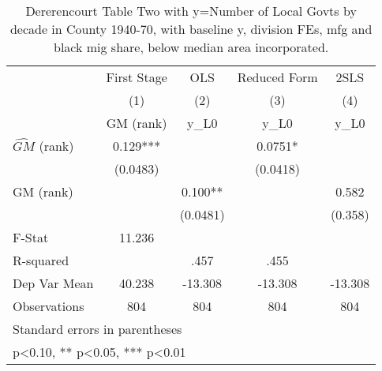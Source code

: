 \begin{table}[htbp]\centering
\def\sym#1{\ifmmode^{#1}\else\(^{#1}\)\fi}
\caption{Dererencourt Table Two with y=Number of Local Govts by decade in County 1940-70, with baseline y, division FEs, mfg and black mig share, below median area incorporated.}
\begin{tabular}{l*{4}{c}}
\toprule
                    & First Stage   &         OLS   &Reduced Form   &        2SLS   \\
                    &\multicolumn{1}{c}{(1)}&\multicolumn{1}{c}{(2)}&\multicolumn{1}{c}{(3)}&\multicolumn{1}{c}{(4)}\\
                    &\multicolumn{1}{c}{GM  (rank)}&\multicolumn{1}{c}{y\_L0}&\multicolumn{1}{c}{y\_L0}&\multicolumn{1}{c}{y\_L0}\\
\midrule
$\hat{GM}$ (rank)   &       0.129***&               &      0.0751*  &               \\
                    &    (0.0483)   &               &    (0.0418)   &               \\
\addlinespace
GM  (rank)          &               &       0.100** &               &       0.582   \\
                    &               &    (0.0481)   &               &     (0.358)   \\
\midrule
F-Stat              &      11.236   &               &               &               \\
R-squared           &               &        .457   &        .455   &               \\
Dep Var Mean        &      40.238   &     -13.308   &     -13.308   &     -13.308   \\
Observations        &         804   &         804   &         804   &         804   \\
\bottomrule
\multicolumn{5}{l}{\footnotesize Standard errors in parentheses}\\
\multicolumn{5}{l}{\footnotesize * p<0.10, ** p<0.05, *** p<0.01}\\
\end{tabular}
\end{table}
